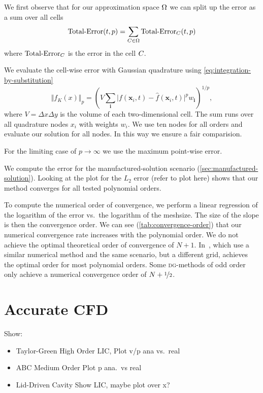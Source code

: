 We first observe that for our approximation space $\broken$ we can split up the error as a sum over all cells
\begin{equation}
  \label{eq:lp-norm-broken}
  \error(t,p) = \sum_{\cell[] \in \broken} \error_{\cell[]}(t,p)
\end{equation}
where $\error_{\cell[]}$ is the error in the cell $\cell[]$.

We evaluate the cell-wise error with Gaussian quadrature using \cref{eq:integration-by-substitution}
 \begin{equation}
   \Vert f_K(x) \Vert_p = \left( V \sum_{\bm{i}} \vert f(\bm{x}_i, t) - \hat{f}(\bm{x}_i, t) \vert^p w_{{\bm{i}}}  \right)^{1/p},
 \end{equation}
where $V = \Delta x \Delta y$ is the volume of each two-dimensional cell.
The sum runs over all quadrature nodes $x_i$ with weights $w_i$.
We use ten nodes for all orders and evaluate our solution for all nodes.
In this way we ensure a fair comparision.

For the limiting case of $p \to \infty$ we use the maximum point-wise error.


We compute the error for the manufactured-solution scenario (\cref{sec:manufactured-solution}).
Looking at the plot for the $L_2$ error (refer to plot here) shows that our method converges for all tested polynomial orders.

To compute the numerical order of convergence, we perform a linear regression of the logarithm of the error vs.\ the logarithm of the meshsize.
The size of the slope is then the convergence order.
We can see (\cref{tab:convergence-order}) that our numerical convergence rate increases with the polynomial order.
We do not achieve the optimal theoretical order of convergence of $N+1$.
In~\cite{dumbser2010arbitrary}, which use a similar numerical method and the same scenario, but a different grid, \citeauthor{dumbser2010arbitrary} achieves the optimal order for most polynomial orders.
Some \textsc{dg}-methods of odd order only achieve a numerical convergence order of $N+\nicefrac{1}{2}$.

\section{Accurate CFD}
Show:
\begin{itemize}
\item Taylor-Green High Order
  LIC, Plot v/p ana vs.\ real
\item ABC Medium Order
  Plot p ana.\ vs real
\item Lid-Driven Cavity
  Show LIC, maybe plot over x?
\end{itemize}


